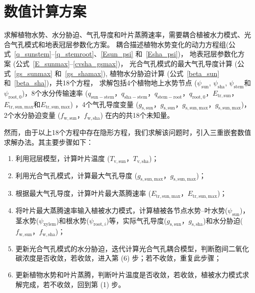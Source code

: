 \section{数值计算方案}\label{数值计算方案}
求解植物水势、水分胁迫、气孔导度和叶片蒸腾速率，需要耦合植被水力模式、光合气孔模式和地表冠层参数化方案。
耦合描述植物水势变化的动力方程组(公式~\eqref{q_sunstem}--\eqref{q_stemroot}、\eqref{Esun_psi} 和~\eqref{Esha_psi})，
地表冠层参数化方案 (公式~\eqref{E_sunmax}--\eqref{cvsha_gsmax})，
光合气孔模式的最大气孔导度计算 (公式~\eqref{gs_sunmax} 和~\eqref{gs_shamax}), 植物水分胁迫计算 (公式~\eqref{beta_sun} 和~\eqref{beta_sha})，共18个方程，
求解包括4个植物地上水势节点 ($\psi_{\mathrm{sun}}$, $\psi_{\mathrm{sha}}$, $\psi_{\mathrm{stem}}$和$\psi_{\mathrm{root,0}}$)，8个水分传输速率
($q_{\mathrm{sun-stem}}$，$q_{\mathrm{sha-stem}}$，$q_{\mathrm{stem-root}}$，$q_{\mathrm{root,0}}$，$E_{\mathrm{tr,sun}}$，$E_{\mathrm{tr,sun,max}}$和$E_{\mathrm{tr,sun,max}}$) ，4个气孔导度变量
($g_{\mathrm{s,sun}}$，$g_{\mathrm{s,sun}}$，$g_{\mathrm{s,sun,max}}$，$g_{\mathrm{s,sun,max}}$)，2个水分胁迫变量 ($f_{\mathrm{w,sun}}$，$f_{\mathrm{w,sha}}$) 在内的共18个未知量。

然而，由于以上18个方程中存在隐形方程，我们求解该问题时，引入三重嵌套数值求解办法。其主要步骤如下：
\begin{enumerate}
  \item 利用冠层模型，计算叶片温度 ($T_{\mathrm{v,sun}}$，$T_{\mathrm{v,sha}}$)；
  \item 利用光合气孔模式，计算最大气孔导度 ($g_{\mathrm{s,sun,max}}$，$g_{\mathrm{s,sun,max}}$)；
  \item 根据最大气孔导度，计算叶片最大蒸腾速率 ($E_{\mathrm{tr,sun,max}}$，$E_{\mathrm{tr,sun,max}}$)；
  \item 将叶片最大蒸腾速率输入植被水力模式，计算植被各节点水势--叶水势($\psi_{\mathrm{sun}}$)，茎水势($\psi_{\mathrm{xylem}}$)和根水势($\psi_{\mathrm{root},i}$)等，实际气孔导度($g_{\mathrm{s,sun}}$，$g_{\mathrm{s,sha}}$)和水分胁迫($f_{\mathrm{w,sun}}$，$f_{\mathrm{w,sha}}$)；
  \item 更新光合气孔模式的水分胁迫，迭代计算光合气孔耦合模型，判断胞间二氧化碳浓度是否收敛，若收敛，进入第 (6) 步；若不收敛，重复此步骤；
  \item 更新植物水势和叶片蒸腾，判断叶片温度是否收敛，若收敛，植被水力模式求解完成，若不收敛，回到第 (1) 步。
\end{enumerate}
